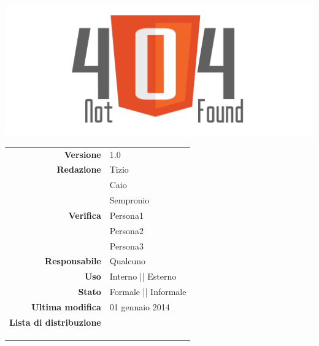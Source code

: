 \thispagestyle{empty}

\begin{titlepage}

	\begin{center}
	\begin{Huge}
		\textbf{\gruppo} \\
	\end{Huge}
	\vspace{0.5cm}
	\begin{Large}
		\textbf{\capitolato}
	\end{Large}
	
	\vspace{1cm}

	\includegraphics[scale=0.35]{img/logo404_Extends.png}
	\vspace{1cm}
	\begin{Huge}
		\textbf{\titDoc}
	\end{Huge}
	
	\vspace{1cm}
	
	\begin{table}[h]
	\begin{center}
	\begin{tabular}{r | l}
		\textbf{Versione} & 1.0 \\
		\textbf{Redazione} & Tizio \\ 
			& Caio \\ 
			& Sempronio \\
		\textbf{Verifica} & Persona1 \\ 
			& Persona2 \\ 
			& Persona3 \\
		\textbf{Responsabile} & Qualcuno \\
		\textbf{Uso} & Interno || Esterno \\
		\textbf{Stato} & Formale || Informale \\
		\textbf{Ultima modifica} & 01 gennaio 2014 \\
		\textbf{Lista di distribuzione} & \gruppo \\ 
			& \Vardanega \\
			& \Cardin \\
			& \Zucchetti \\
	\end{tabular}
	\end{center}
	\end{table}
	\end{center}
\end{titlepage}